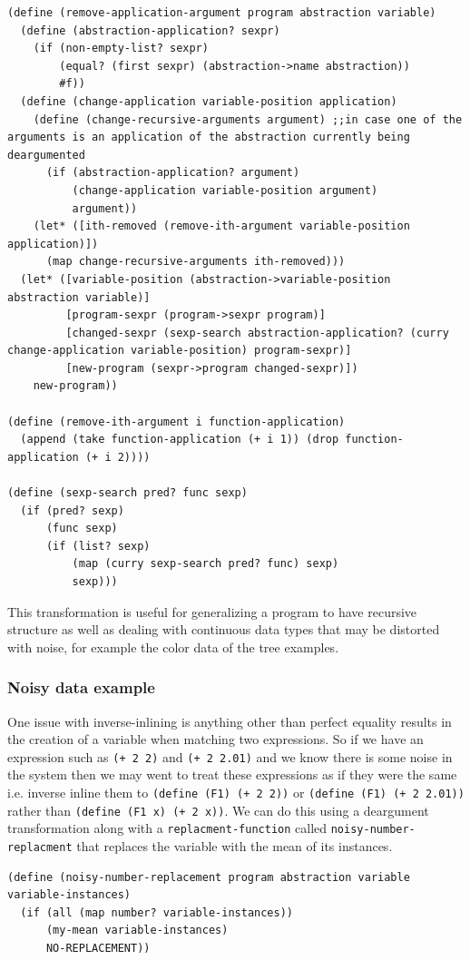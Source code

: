 \documentclass[a4paper,10pt]{article}
\begin{document}
\begin{lstlisting}[frame=trBL]
(define (remove-application-argument program abstraction variable)
  (define (abstraction-application? sexpr)
    (if (non-empty-list? sexpr)
        (equal? (first sexpr) (abstraction->name abstraction))
        #f))
  (define (change-application variable-position application)
    (define (change-recursive-arguments argument) ;;in case one of the arguments is an application of the abstraction currently being deargumented
      (if (abstraction-application? argument)
          (change-application variable-position argument)
          argument))
    (let* ([ith-removed (remove-ith-argument variable-position application)])
      (map change-recursive-arguments ith-removed)))
  (let* ([variable-position (abstraction->variable-position abstraction variable)]
         [program-sexpr (program->sexpr program)]
         [changed-sexpr (sexp-search abstraction-application? (curry change-application variable-position) program-sexpr)]
         [new-program (sexpr->program changed-sexpr)])
    new-program))

(define (remove-ith-argument i function-application)
  (append (take function-application (+ i 1)) (drop function-application (+ i 2))))

(define (sexp-search pred? func sexp)
  (if (pred? sexp)
      (func sexp)
      (if (list? sexp)
          (map (curry sexp-search pred? func) sexp)
          sexp)))
\end{lstlisting}
This transformation is useful for generalizing a program to have recursive structure as well as dealing with continuous data types that may be distorted with noise, for example the color data of the tree examples.

\subsubsection{Noisy data example}
One issue with inverse-inlining is anything other than perfect equality results in the creation of a variable when matching two expressions.  So if we have an expression such as \texttt{(+ 2 2)} and \texttt{(+ 2 2.01)} and we know there is some noise in the system then we may went to treat these expressions as if they were the same i.e. inverse inline them to \texttt{(define (F1) (+ 2 2))} or \texttt{(define (F1) (+ 2 2.01))} rather than \texttt{(define (F1 x) (+ 2 x))}.  We can do this using a deargument transformation along with a \texttt{replacment-function} called \texttt{noisy-number-replacment} that replaces the variable with the mean of its instances.  
\begin{lstlisting}[frame=trBL]
(define (noisy-number-replacement program abstraction variable variable-instances)
  (if (all (map number? variable-instances))
      (my-mean variable-instances)
      NO-REPLACEMENT))
\end{lstlisting}
\end{document}
